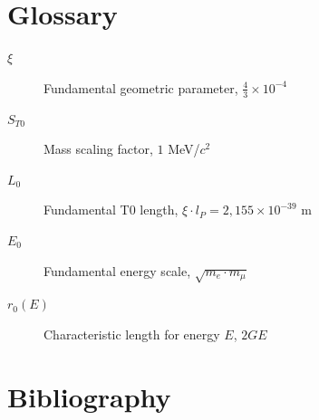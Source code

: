 	\section*{Glossary}
	
	\begin{description}
		\item[$\xi$] Fundamental geometric parameter, $\frac{4}{3} \times 10^{-4}$
		\item[$S_{T0}$] Mass scaling factor, $1$ MeV/$c^2$
		\item[$L_0$] Fundamental T0 length, $\xi \cdot l_P = 2{,}155 \times 10^{-39}$ m
		\item[$E_0$] Fundamental energy scale, $\sqrt{m_e \cdot m_\mu}$
		\item[$r_0(E)$] Characteristic length for energy $E$, $2GE$
	\end{description}
	
	
	
	\section{Bibliography}
	
